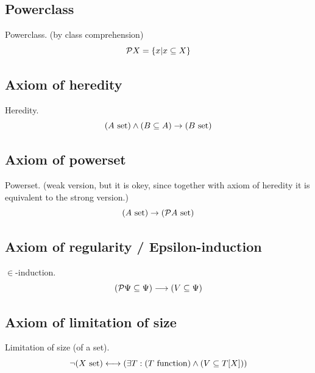\subsection{Powerclass}
\begin{definition}
\label{def:powerclass}
Powerclass. (by class comprehension)
\[
\mathcal{P} X = \{x|x\subseteq X\}
\]
\end{definition}
\subsection{Axiom of heredity}
\begin{axiom}
\label{axm:heredity}
Heredity.
\[
(A\mathrm{\ set}) \land (B\subseteq A) \rightarrow (B\mathrm{\ set})
\]
\end{axiom}
\subsection{Axiom of powerset}
\begin{axiom}
\label{axm:powerset}
Powerset. (weak version, but it is okey, since together with axiom of heredity it is equivalent to the strong version.)
\[(A\mathrm{\ set}) \rightarrow (\mathcal{P} A\mathrm{\ set})\]
\end{axiom}

\subsection{Axiom of regularity / Epsilon-induction}
\begin{axiom} 
\label{axn:epsilon induction}
$\in$-induction. %
\[
(\mathcal{P}\Psi\subseteq\Psi)\longrightarrow(V\subseteq\Psi)
\]
\end{axiom}


\subsection{Axiom of limitation of size}
\begin{axiom}
\label{axm:limitation of size}
Limitation of size (of a set).
\[
\neg(X\mathrm{\ set}) \longleftrightarrow (\exists T: (T\mathrm{\ function})\land (V\subseteq T[X]))
\]
\end{axiom}

